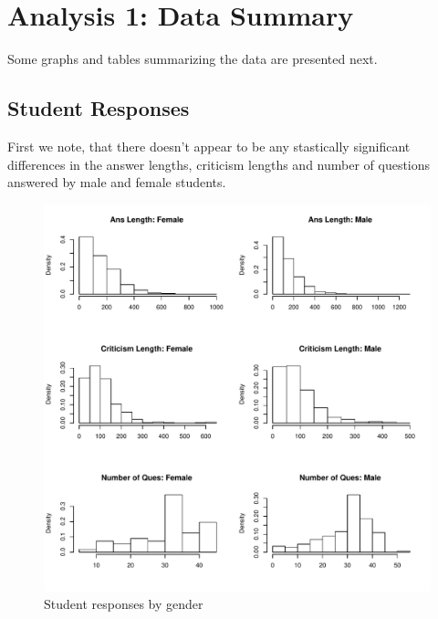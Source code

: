 \documentclass[11pt]{article} %
\begin{document}
\section{Analysis 1: Data Summary}
Some graphs and tables summarizing the data are presented next.

\subsection{Student Responses} 
First we note, that there doesn't appear to be any stastically significant differences in the answer lengths, criticism lengths and number of questions answered by male and female students. 
\begin{figure}[H]
\caption{Student responses by gender}
\centering
\includegraphics[width = 0.85 \textwidth]{comparison1.pdf}
\end{figure}
\newpage
\end{document}

